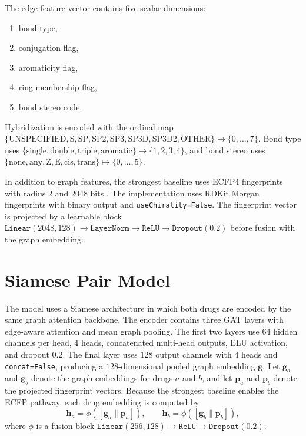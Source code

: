 \documentclass[12pt,a4paper]{report}
\begin{document}
The edge feature vector contains five scalar dimensions:
\begin{enumerate}
    \item bond type,
    \item conjugation flag,
    \item aromaticity flag,
    \item ring membership flag,
    \item bond stereo code.
\end{enumerate}

Hybridization is encoded with the ordinal map \(\{\text{UNSPECIFIED}, \text{S}, \text{SP}, \text{SP2}, \text{SP3}, \text{SP3D}, \text{SP3D2}, \text{OTHER}\} \mapsto \{0,\dots,7\}\). Bond type uses \(\{\text{single}, \text{double}, \text{triple}, \text{aromatic}\} \mapsto \{1,2,3,4\}\), and bond stereo uses \(\{\text{none}, \text{any}, \text{Z}, \text{E}, \text{cis}, \text{trans}\} \mapsto \{0,\dots,5\}\).

In addition to graph features, the strongest baseline uses ECFP4 fingerprints with radius 2 and 2048 bits \cite{rogers2010ecfp}. The implementation uses RDKit Morgan fingerprints with binary output and \texttt{useChirality=False}. The fingerprint vector is projected by a learnable block \(\texttt{Linear}(2048,128) \rightarrow \texttt{LayerNorm} \rightarrow \texttt{ReLU} \rightarrow \texttt{Dropout}(0.2)\) before fusion with the graph embedding.

\section{Siamese Pair Model}
The model uses a Siamese architecture in which both drugs are encoded by the same graph attention backbone. The encoder contains three GAT layers with edge-aware attention and mean graph pooling. The first two layers use \(64\) hidden channels per head, \(4\) heads, concatenated multi-head outputs, ELU activation, and dropout 0.2. The final layer uses \(128\) output channels with \(4\) heads and \texttt{concat=False}, producing a \(128\)-dimensional pooled graph embedding \(\mathbf{g}\). Let \(\mathbf{g}_a\) and \(\mathbf{g}_b\) denote the graph embeddings for drugs \(a\) and \(b\), and let \(\mathbf{p}_a\) and \(\mathbf{p}_b\) denote the projected fingerprint vectors. Because the strongest baseline enables the ECFP pathway, each drug embedding is computed by
\begin{equation}
\mathbf{h}_a = \phi([\mathbf{g}_a \| \mathbf{p}_a]), \qquad
\mathbf{h}_b = \phi([\mathbf{g}_b \| \mathbf{p}_b]),
\end{equation}
where \(\phi\) is a fusion block \(\texttt{Linear}(256,128) \rightarrow \texttt{ReLU} \rightarrow \texttt{Dropout}(0.2)\).
\end{document}
